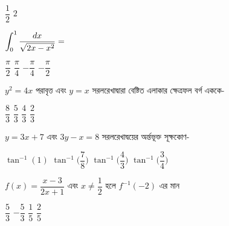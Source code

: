 \documentclass[addpoints]{exam}
\begin{document}
\begin{questions}
\begin{oneparchoices}
\choice $ \dfrac{1}{2} $
\choice $ 2 $
\end{oneparchoices}

\question  $ \mathlarger{\int_{0}^{1}\dfrac{dx}{\sqrt{2x-x^{2}}}} = $ 

\begin{oneparchoices}
\choice $ \dfrac{\pi}{2} $
\choice $ \dfrac{\pi}{4} $
\choice $ -\dfrac{\pi}{4} $
\choice $ -\dfrac{\pi}{2} $
\end{oneparchoices}

\question $ y^{2}=4x $ পরাবৃত্ত এবং $ y = x $ সরলরেখাদ্বারা বেষ্টিত এলাকার ক্ষেত্রফল বর্গ এককে-

\begin{oneparchoices}
\choice $ \dfrac{8}{3} $
\choice $ \dfrac{5}{3} $
\choice $ \dfrac{4}{3} $
\choice  $ \dfrac{2}{3} $
\end{oneparchoices}

\question $ y=3x+7 $ এবং $ 3y-x=8 $ সরলরেখাদ্বয়ের অর্ন্তভূক্ত সূক্ষকোণ-

\begin{oneparchoices}
\choice $ \tan^{-1}(1) $
\choice $ \tan^{-1}\Big(\dfrac{7}{8}\Big) $
\choice $ \tan^{-1}\Big(\dfrac{4}{3}\Big) $
\choice  $ \tan^{-1}\Big(\dfrac{3}{4}\Big) $
\end{oneparchoices}

\question $ f(x) = \dfrac{x-3}{2x+1} $ এবং $ x\neq \dfrac{1}{2}$ হলে $ f^{-1}(-2) $ এর মান 

\begin{oneparchoices}
\choice $ \dfrac{5}{3} $
\choice $ -\dfrac{5}{3} $
\choice $ \dfrac{1}{5} $
\choice  $ \dfrac{2}{5} $
\end{oneparchoices}

\end{questions}
\end{document}
